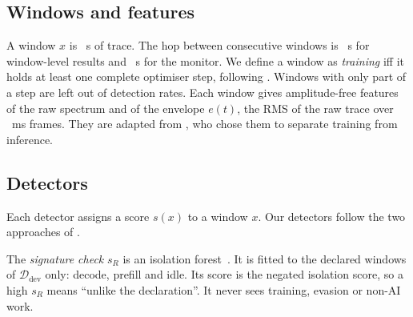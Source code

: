 \subsection{Windows and features}
A window $x$ is \Win{}~s of trace. The hop between consecutive windows is \HopSnap{}~s
for window-level results and \HopMon{}~s for the monitor. We define a window as
\emph{training} iff it holds at least one
complete optimiser step, following \citet{gargiulo2026}. Windows with only part
of a step are left out of detection rates. Each window gives \NFeat{} amplitude-free
features of the raw spectrum and of the envelope $e(t)$, the RMS of the raw trace over
\EnvFrame{}~ms frames. They are adapted from \citet{gargiulo2026}, who chose them to
separate training from inference.

\subsection{Detectors}\label{s:detectors}
Each detector assigns a score $s(x)$ to a window $x$. Our detectors follow the two
approaches of \citet{scher2025}.

The \emph{signature check} $s_R$ is an isolation
forest~\citep{liu2008}. It is fitted to the declared windows of
$\mathcal{D}_{\mathrm{dev}}$ only: decode, prefill and idle. Its score is the negated isolation score, so a high $s_R$ means ``unlike the
declaration''. It never sees training, evasion or non-AI work.

